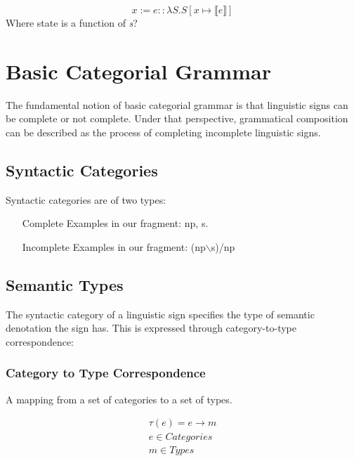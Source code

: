 \documentclass[letterpaper,12pt]{article}
\begin{document}
\begin{equation}
x := e  ::  \lambda S . S [ x \mapsto \llbracket e \rrbracket ]
\end{equation}
 Where state is a function of \textit{s}? 

\section{Basic Categorial Grammar}

The fundamental notion of basic categorial grammar is that linguistic signs can be complete or not complete. Under that perspective, grammatical composition can be described as the process of completing incomplete linguistic signs.

\subsection{Syntactic Categories}

Syntactic categories are of two types:

\begin{itemize}
\item[Complete]
Examples in our fragment: np, s.
\item[Incomplete]
Examples in our fragment: (np$\backslash$s)/np
\end{itemize}

\subsection{Semantic Types}

The syntactic category of a linguistic sign specifies the type of semantic denotation the sign has. This is expressed through category-to-type correspondence:

\subsubsection{Category to Type Correspondence}

A mapping from a set of categories to a set of types.

\begin{equation}
\begin{split}
\tau ( e ) = e \rightarrow m \\
e \in Categories \\
m \in Types \\
\end{split}
\end{equation}
\end{document}
